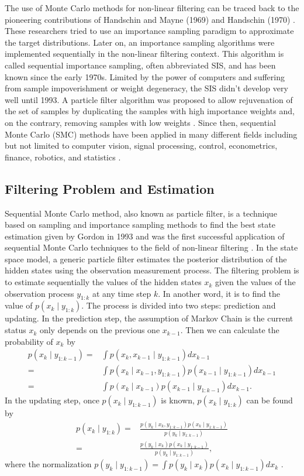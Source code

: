 The use of Monte Carlo methods for non-linear filtering can be traced back to the pioneering contributions of Handschin and Mayne (1969) \cite{handschin1969monte} and Handschin
(1970) \cite{handschin1970monte}. These researchers tried to use an importance sampling paradigm to approximate the target distributions. Later on, an importance sampling algorithms were implemented sequentially in the non-linear filtering context. This algorithm is called sequential importance sampling, often abbreviated SIS, and has been known since the early 1970s. Limited by the power of computers and  suffering from sample impoverishment or weight degeneracy, the SIS didn't develop very well until 1993. A particle filter algorithm was proposed to allow rejuvenation of the set of samples by duplicating the samples with high importance weights and, on the contrary, removing samples with low weights \cite{cappe2009inference}. Since then, sequential Monte Carlo (SMC) methods have been applied in many different fields including but not limited to computer vision, signal processing, control, econometrics, finance, robotics, and statistics \cite{smcmip2011}  \cite{ristic2004beyond}.


\subsection{Filtering Problem and Estimation}
Sequential Monte Carlo method, also known as particle filter, is a technique based on sampling and importance sampling methods to find the best state estimation given by Gordon in 1993 \cite{gordon1993novel} and was the first successful application of sequential Monte Carlo techniques to the field of non-linear filtering \cite{cappe2009inference}. In the state space model, a generic particle filter estimates the posterior distribution of the hidden states using the observation measurement process. The filtering problem is to estimate sequentially the values of the hidden states $x_k$ given the values of the observation process $y_{1:k}$ at any time step $k$. In another word, it is to find the value of $p(x_k \mid  y_{1:k})$. The process is divided into two steps: prediction and updating. In the prediction step, the assumption of Markov Chain is the current status $x_k$ only depends on the previous one $x_{k-1}$. Then we can calculate the probability of $x_k$ by 
\begin{align*}
p(x_k\mid y_{1:k-1})=&\int p(x_k,x_{k-1}\mid y_{1:k-1}) dx_{k-1}\\
=&\int p(x_k\mid x_{k-1},y_{1:k-1}) p(x_{k-1}\mid y_{1:k-1})dx_{k-1}\\
=&\int p(x_k\mid x_{k-1}) p(x_{k-1}\mid y_{1:k-1})dx_{k-1}.
\end{align*}
In the updating step, once $p(x_k\mid y_{1:k-1})$ is known, $p(x_k\mid y_{1:k})$ can be found by
\begin{align*}
p(x_k\mid y_{1:k})=&\frac{p(y_k\mid x_k,y_{1:k-1})p(x_{k}\mid y_{1:k-1})}{p(y_k\mid  y_{1:k-1})} \\
=&\frac{p(y_k\mid x_k)p(x_{k}\mid y_{1:k-1})}{p(y_k\mid  y_{1:k-1})},
\end{align*}
where the normalization $p(y_k\mid  y_{1:k-1})=\int p(y_k\mid x_k)p(x_k\mid  y_{1:k-1}) dx_k$ \cite{arulampalam2002tutorial}.

